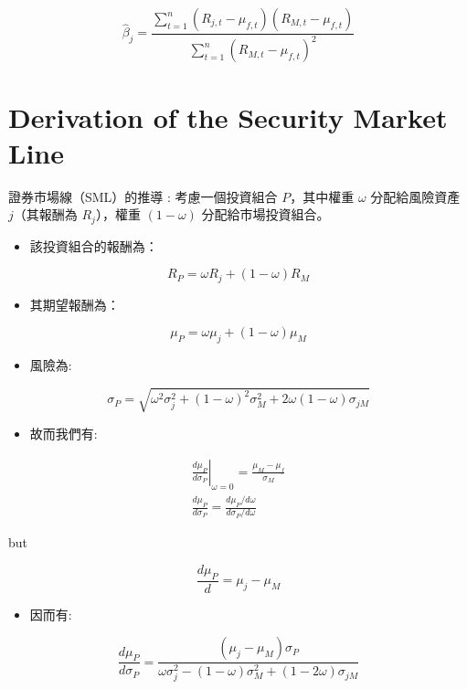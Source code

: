 \documentclass[letterpaper]{article}
\begin{document}
$$
\hat{\beta}_{j}=\frac{\sum_{t=1}^{n}\left(R_{j, t}-\mu_{f, t}\right)\left(R_{M, t}-\mu_{f, t}\right)}{\sum_{t=1}^{n}\left(R_{M, t}-\mu_{f, t}\right)^{2}}
$$

\section*{Derivation of the Security Market Line}
證券市場線（SML）的推導 : 考慮一個投資組合 $P$，其中權重 $\omega$ 分配給風險資產 $j$（其報酬為 $R_{j}$），權重 $(1-\omega)$ 分配給市場投資組合。

\begin{itemize}
	\item 該投資組合的報酬為：
\end{itemize}


$$
R_{P}=\omega R_{j}+(1-\omega) R_{M}
$$

\begin{itemize}
	\item 其期望報酬為：
\end{itemize}

$$
\mu_{P}=\omega \mu_{j}+(1-\omega) \mu_{M}
$$

\begin{itemize}
  \item 風險為:
\end{itemize}

$$
\sigma_{P}=\sqrt{\omega^{2} \sigma_{j}^{2}+(1-\omega)^{2} \sigma_{M}^{2}+2 \omega(1-\omega) \sigma_{j M}}
$$

\begin{itemize}
  \item 故而我們有:
\end{itemize}

$$
\begin{gathered}
\left.\frac{d \mu_{P}}{d \sigma_{P}}\right|_{\omega=0}=\frac{\mu_{M}-\mu_{f}}{\sigma_{M}} \\
\frac{d \mu_{P}}{d \sigma_{P}}=\frac{d \mu_{P} / d \omega}{d \sigma_{P} / d \omega}
\end{gathered}
$$

but

$$
\frac{d \mu_{P}}{d}=\mu_{j}-\mu_{M}
$$


\begin{itemize}
  \item 因而有:
\end{itemize}

$$
\frac{d \mu_{P}}{d \sigma_{P}}=\frac{\left(\mu_{j}-\mu_{M}\right) \sigma_{P}}{\omega \sigma_{j}^{2}-(1-\omega) \sigma_{M}^{2}+(1-2 \omega) \sigma_{j M}}
$$
\end{document}
